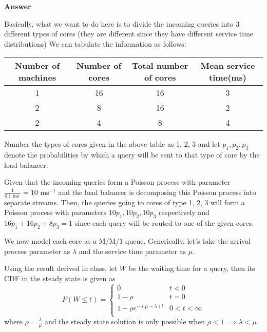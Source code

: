 \documentclass[12pt, oneside]{article}
\begin{document}
\begin{enumerate}
{    \textbf{Answer}

    Basically, what we want to do here is to divide the incoming queries into 3 different
    types of cores (they are different since they have different service time distributions)
    We can tabulate the information as follows:

    \begin{center}
        \begin{tabular}{| c | c | c | c |}
            \hline
            Number of machines & Number of cores & Total number of cores & Mean service time(ms) \\
            \hline
            1 & 16 & 16 & 3 \\
            2 & 8 & 16 & 2 \\
            2 & 4 & 8 & 4 \\
            \hline
        \end{tabular}
    \end{center}

    Number the types of cores given in the above table as 1, 2, 3 and let \(p_1, p_2, p_3\)
    denote the probabilities by which a query will be sent to that type of core by the load
    balancer.

    Given that the incoming queries form a Poisson process with parameter 
    \(\frac{1}{0.1 \text{ ms }} = 10 \text{ ms}^{-1}\) and the load balancer is decomposing
    this Poisson process into separate streams. Then, the queries going to cores of type
    1, 2, 3 will form a Poisson process with parameters \(10p_1, 10p_2, 10p_3\) respectively
    and \(16p_1 + 16p_2 + 8p_3 = 1\) since each query will be routed to one of the given
    cores.

    We now model each core as a M/M/1 queue. Generically, let's take the arrival process
    parameter as \(\lambda\) and the service time parameter as \(\mu\).

    Using the result derived in class, let \(W\) be the waiting time for a query, then
    its CDF in the steady state is given as
    \[
        P(W \leq t) = \begin{cases}
                        0 & t < 0 \\
                        1 - \rho & t = 0 \\
                        1 - \rho e^{-(\mu - \lambda)t} & 0 < t < \infty \\
                      \end{cases}
    \]
    where \(\rho = \frac{\lambda}{\mu}\) and the steady state solution is only possible
    when \(\rho < 1 \implies \lambda < \mu\)

}
\end{enumerate}
\end{document}
